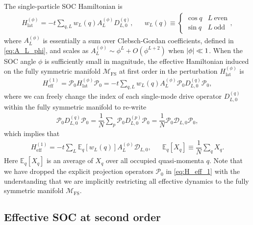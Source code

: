 \documentclass[nofootinbib,notitlepage,11pt]{revtex4-2}
\renewcommand{\t}{\text} %
\newcommand{\f}[2]{\dfrac{#1}{#2}} %
\newcommand{\p}[1]{\left(#1\right)} %
\renewcommand{\sp}[1]{\left[#1\right]} %
\newcommand{\1}{\mathds{1}}
\newcommand{\D}{\mathcal{D}}
\newcommand{\M}{\mathcal{M}}
\renewcommand{\P}{\mathcal{P}}
\newcommand{\EE}{\mathbb{E}}
\newcommand{\FS}{\text{FS}}
\begin{document}
The single-particle SOC Hamiltonian is
\begin{align}
  H_{\t{lat}}^{(\phi)}
  = -t \sum_{q,L} w_L\p{q} A_L^{(\phi)} D_{L,0}^{(q)},
  &&
  w_L\p{q} \equiv
  \begin{cases}
    \cos q & L~\t{even} \\
    \sin q & L~\t{odd}
  \end{cases},
  \label{eq:H_lat_SOC_A}
\end{align}
where $A_L^{(\phi)}$ is essentially a sum over Clebsch-Gordan
coefficients, defined in \eqref{eq:A_L_phi}, and scales as
$A_L^{(\phi)} \sim \phi^L + O\p{\phi^{L+2}}$ when $\abs{\phi}\ll1$.
When the SOC angle $\phi$ is sufficiently small in magnitude, the
effective Hamiltonian induced on the fully symmetric manifold $\M_\FS$
at first order in the perturbation $H_{\t{lat}}^{(\phi)}$ is
\begin{align}
  H_{\t{eff}}^{(1)}
  = \P_0 H_{\t{lat}}^{(\phi)} \P_0
  = -t \sum_{q,L} w_L\p{q} A_L^{(\phi)} \P_0 D_{L,0}^{(q)} \P_0,
\end{align}
where we can freely change the index of each single-mode drive
operator $D_{L,0}^{(q)}$ within the fully symmetric manifold to
re-write
\begin{align}
  \P_0 D_{L,0}^{(q)} \P_0 = \f1N \sum_p \P_0 D_{L,0}^{(p)} \P_0
  = \f1N \P_0 \D_{L,0} \P_0,
\end{align}
which implies that
\begin{align}
  H_{\t{eff}}^{(1)}
  = -t \sum_L \EE_q\sp{w_L\p{q}} A_L^{(\phi)} \D_{L,0},
  &&
  \EE_q\sp{X_q} \equiv \f1N \sum_q X_q.
  \label{eq:H_eff_1}
\end{align}
Here $\EE_q\sp{X_q}$ is an average of $X_q$ over all occupied
quasi-momenta $q$.  Note that we have dropped the explicit projection
operators $\P_0$ in \eqref{eq:H_eff_1} with the understanding that we
are implicitly restricting all effective dynamics to the fully
symmetric manifold $\M_\FS$.

\subsection{Effective SOC at second order}
\label{sec:H_eff_2}
\end{document}
